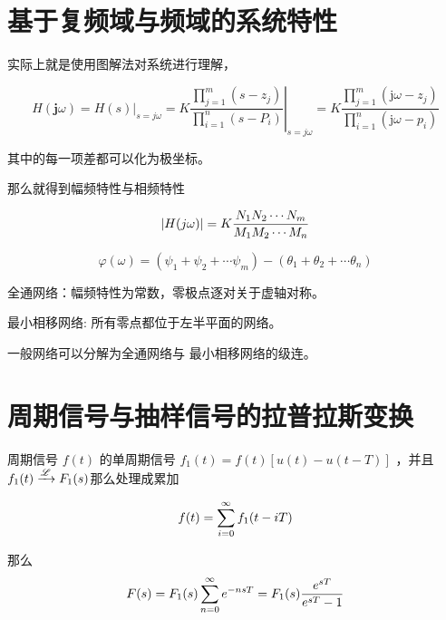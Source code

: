 \documentclass[cn,11pt,chinese,black,simple]{../elegantbook}
\begin{document}
\section{基于复频域与频域的系统特性}

实际上就是使用图解法对系统进行理解，

\[{H}(\mathbf{j} \omega)=\left.{H}(s)\right|_{s=j \omega}=\left.{K} \dfrac{\prod_{j=1}^{m}\left(s-z_{j}\right)}{\prod_{i=1}^{n}\left(s-{P}_{i}\right)}\right|_{s=j \omega}={K} \dfrac{\prod_{j=1}^{m}\left(\mathrm{j} \omega-z_{j}\right)}{\prod_{i=1}^{n}\left(\mathrm{j} \omega-p_{i}\right)}\]

其中的每一项差都可以化为极坐标。

那么就得到幅频特性与相频特性

\[\left| H(j \omega) \right| = K \dfrac{N_1 N_2 \cdots N_m}{M_1 M_2 \cdots M_n}\]

\[\varphi(\omega)=\left(\psi_{1}+\psi_{2}+\cdots \psi_{m}\right)-\left(\theta_{1}+\theta_{2}+\cdots \theta_{n}\right)\]



全通网络：幅频特性为常数，零极点逐对关于虚轴对称。

最小相移网络: 所有零点都位于左半平面的网络。

一般网络可以分解为全通网络与
最小相移网络的级连。


\section{周期信号与抽样信号的拉普拉斯变换}

周期信号 \(f(t)\) 的单周期信号 \(f_1(t) = f(t) [u(t) - u(t-T)]\) ，并且 \(f_1(t) \xrightarrow{\mathscr{L}} F_1(s)\)那么处理成累加


\[f(t) = \displaystyle\sum_{i = 0}^{\infty} f_1(t-i T)\] 

那么 \[F(s) = F_1(s) \displaystyle\sum_{n = 0}^{\infty} e^{-nsT} = F_1(s) \dfrac{e^{sT}}{e^{sT}-1}\]



\ifx\mainclass\undefined
\end{document}
